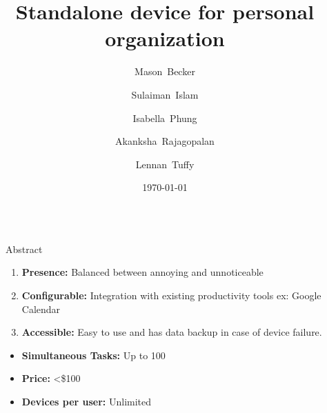 \documentclass[final]{beamer}
\title{Standalone device for personal organization}
\author{
  Mason~Becker
  \and
  Sulaiman~Islam
  \and
  Isabella~Phung
  \and
  Akanksha~Rajagopalan
  \and
  Lennan~Tuffy
}
\institute[UC Santa Cruz]{CSE 123 - Supervised by Prof. David Harrison}
\date{\today}
\newlength{\sepwidth}
\newlength{\colwidth}
\newcommand{\separatorcolumn}{\begin{column}{\sepwidth}\end{column}}
\begin{document}
\begin{frame}[t]
  \begin{columns}[t]
    \separatorcolumn

    \begin{column}{\colwidth}

      \begin{block}{Abstract}
        \begin{enumerate}
          \item \textbf{Presence:} Balanced between annoying and unnoticeable
          \item \textbf{Configurable:} Integration with existing productivity tools ex: Google Calendar
          \item \textbf{Accessible:} Easy to use and has data backup in case of device failure.
        \end{enumerate}
        \begin{itemize}
          \item \textbf{Simultaneous Tasks:} Up to 100
          \item \textbf{Price:} <\$100
          \item \textbf{Devices per user:} Unlimited
        \end{itemize}
      \end{block}


\end{column}
\end{columns}
\end{frame}
\end{document}

